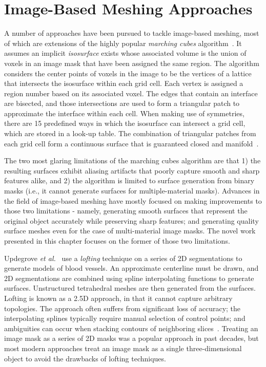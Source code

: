 \section{Image-Based Meshing Approaches}
\label{Image-Based Meshing Approaches}

A number of approaches have been pursued to tackle image-based meshing, most of which are extensions of the highly popular \textit{marching cubes} algorithm~\cite{lorensen_1987}. It assumes an implicit \textit{isosurface} exists whose associated volume is the union of voxels in an image mask that have been assigned the same region. The algorithm considers the center points of voxels in the image to be the vertices of a lattice that intersects the isosurface within each grid cell. Each vertex is assigned a region number based on its associated voxel. The edges that contain an interface are bisected, and those intersections are used to form a triangular patch to approximate the interface within each cell. When making use of symmetries, there are 15 predefined ways in which the isosurface can intersect a grid cell, which are stored in a look-up table. The combination of triangular patches from each grid cell form a continuous surface that is guaranteed closed and manifold~\cite{young_2008}.

The two most glaring limitations of the marching cubes algorithm are that 1) the resulting surfaces exhibit aliasing artifacts that poorly capture smooth and sharp features alike, and 2) the algorithm is limited to surface generation from binary masks (i.e., it cannot generate surfaces for multiple-material masks). Advances in the field of image-based meshing have mostly focused on making improvements to those two limitations - namely, generating smooth surfaces that represent the original object accurately while preserving sharp features; and generating quality surface meshes even for the case of multi-material image masks. The novel work presented in this chapter focuses on the former of those two limitations.

Updegrove \textit{et al.}~\cite{updegrove_2016} use a \textit{lofting} technique on a series of 2D segmentations to generate models of blood vessels. An approximate centerline must be drawn, and 2D segmentations are combined using spline interpolating functions to generate surfaces. Unstructured tetrahedral meshes are then generated from the surfaces. Lofting is known as a 2.5D approach, in that it cannot capture arbitrary topologies. The approach often suffers from significant loss of accuracy; the interpolating splines typically require manual selection of control points; and ambiguities can occur when stacking contours of neighboring slices~\cite{young_2008}. Treating an image mask as a series of 2D masks was a popular approach in past decades, but most modern approaches treat an image mask as a single three-dimensional object to avoid the drawbacks of lofting techniques.

